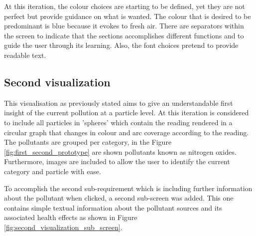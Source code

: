 At this iteration, the colour choices are starting to be defined, yet they are not perfect but provide guidance on what is wanted. The colour that is desired to be predominant is blue because it evokes to fresh air. There are separators within the screen to indicate that the sections accomplishes different functions and to guide the user through its learning. Also, the font choices pretend to provide readable text. 

\subsection{Second visualization}
This visualisation as previously stated aims to give an understandable first insight of the current pollution at a particle level. At this iteration is considered to include all particles in 'spheres' which contain the reading rendered in a circular graph that changes in colour and arc coverage according to the reading. The pollutants are grouped per category, in the Figure \ref{fig:first_second_prototype} are shown pollutants known as nitrogen oxides. Furthermore, images are included to allow the user to identify the current category and particle with ease.

To accomplish the second sub-requirement which is including further information about the pollutant when clicked, a second sub-screen was added. This one contains simple textual information about the pollutant sources and its associated health effects as shown in Figure \ref{fig:second_visualization_sub_screen}. 

